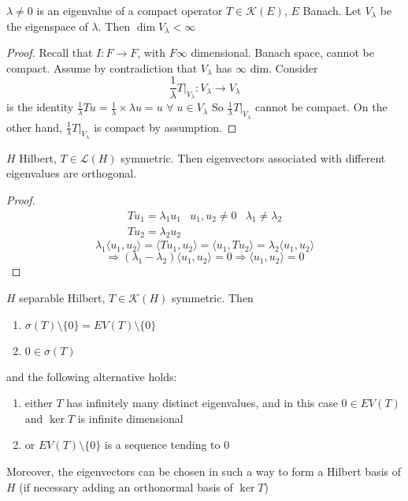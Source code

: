 \begin{proposition}
    \(\lambda \neq 0\) is an eigenvalue of a compact operator \(T \in \mathcal{K}(E)\), \(E \) Banach. Let \(V_\lambda\) be the eigenspace of \(\lambda\). Then \(\dim V_\lambda < \infty\)
\end{proposition}
\begin{proof}
    Recall that \(I: F \to F \), with \(F \infty\) dimensional. Banach space, cannot be compact. Assume by contradiction that \(V_\lambda\) has \(\infty\) dim. Consider
    \[
        \frac{1}{\lambda} T |_{V_\lambda}: V_\lambda \to V_\lambda 
    \]
    is the identity \(\frac{1}{\lambda} T u = \frac{1}{\lambda} \times \lambda u = u\) \(\forall\; u \in V_\lambda\) 
    So \(\frac{1}{\lambda} T |_{V_\lambda}\) cannot be compact. On the other hand, \(\frac{1}{\lambda} T |_{V_\lambda}\) is compact by assumption.
\end{proof}

\begin{proposition}
    \(H\) Hilbert, \(T \in \mathcal{L}(H)\) symmetric. Then eigenvectors associated with different eigenvalues are orthogonal. 
\end{proposition}
\begin{proof}
    \[
        \begin{array}{ccc}
            Tu_1 = \lambda_1 u_1 & u_1, u_2 \neq 0 & \lambda_1 \neq \lambda_2 \\
            Tu_2 = \lambda_2 u_2 
        \end{array}
    \]
    \[
        \lambda_1 \langle u_1, u_2 \rangle = \langle Tu_1, u_2\rangle = \langle u_1, T u_2\rangle = \lambda_2 \langle u_1, u_2\rangle
    \]
    \[
        \Rightarrow (\lambda_1 - \lambda_2) \langle u_1, u_2\rangle = 0 \Rightarrow \langle u_1, u_2\rangle = 0
    \]
\end{proof}

\begin{theorem}
    \(H\) separable Hilbert, \(T \in \mathcal{K}(H)\) symmetric. Then
    \begin{enumerate}
        \item \(\sigma(T) \setminus \{0\} = EV (T) \setminus \{0\}\)
        \item \(0 \in \sigma(T)\)
    \end{enumerate}
    and the following alternative holds:
    \begin{enumerate}
        \item either \(T\) has infinitely many distinct eigenvalues, and in this case \(0 \in EV(T)\) and \(\ker T\) is infinite dimensional
        \item or \(EV(T) \setminus \{0\} \) is a sequence tending to \(0\)
    \end{enumerate}
    Moreover, the eigenvectors can be chosen in such a way to form a Hilbert basis of \(H\) (if necessary adding an orthonormal basis of \(\ker T\))
\end{theorem}

